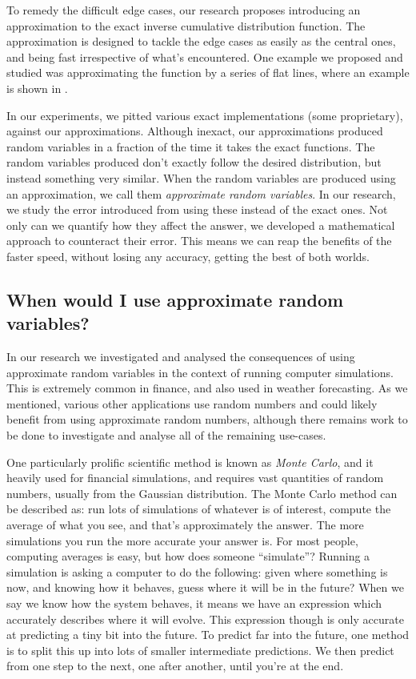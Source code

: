 \documentclass[11pt,a4paper,oneside,english]{extarticle}
\begin{document}
To remedy the difficult edge cases, our research proposes introducing an approximation to the exact inverse cumulative distribution function. The approximation is designed to tackle the edge cases as easily as the central ones, and being fast irrespective of what's encountered. One example we proposed and studied was approximating the function by a series of flat lines, where an example is shown in . 

In our experiments, we pitted various exact implementations (some proprietary), against our approximations. Although inexact, our approximations produced random variables in a fraction of the time it takes the exact functions. The random variables produced don't exactly follow the desired distribution, but instead something very similar. When the random variables are produced  using an approximation, we call them \emph{approximate random variables}. In our research, we study the error introduced from using these instead of the exact ones. Not only can we quantify how they affect the answer, we developed a mathematical approach to counteract their error. This means we can reap the benefits of the faster speed, without losing any accuracy, getting the best of both worlds. 

\subsection{When would I use approximate random variables?}

In our research we investigated and analysed the consequences of using approximate random variables in the context of running computer simulations. This is extremely common in finance, and also used in weather forecasting. As we mentioned, various other applications use random numbers and could likely benefit from using approximate random numbers, although there remains work to be done to investigate and analyse all of the remaining use-cases.

One particularly prolific scientific method is known as \emph{Monte Carlo}, and it heavily used for financial simulations, and requires vast quantities of random numbers, usually from the Gaussian distribution. The Monte Carlo method can be described as: run lots of simulations of whatever is of interest, compute the average of what you see, and that's approximately the answer. The more simulations you run the more accurate your answer is. For most people, computing averages is easy, but how does someone ``simulate''? Running a simulation is asking a computer to do the following: given where something is now, and knowing how it behaves, guess where it will be in the future? When we say we know how the system behaves, it means we have an expression which accurately describes where it will evolve. This expression though is only accurate at predicting a tiny bit into the future. To predict far into the future, one method is to split this up into lots of smaller intermediate predictions. We then predict from one step to the next, one after another, until you're at the end. 
\end{document}

